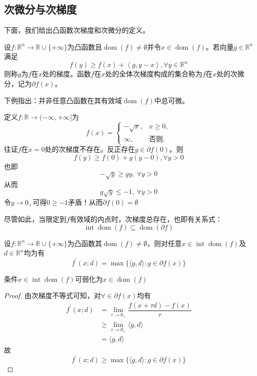 \subsection{次微分与次梯度}
下面，我们给出凸函数次梯度和次微分的定义。
\begin{definition}
    设$f:\mathbb{R}^n\to\mathbb{R}\cup\{+\infty\}$为凸函数且$\operatorname{dom}(f)\neq \emptyset$并令$x\in\operatorname{dom}(f)$。若向量$g\in \mathbb{R}^n$满足
    \[
        f(y)\geq f(x) + \left\langle g, y-x \right\rangle,\forall y\in\mathbb{R}^n
    \]
    则称$g$为$f$在$x$处的梯度。函数$f$在$x$处的全体次梯度构成的集合称为$f$在$x$处的次微分，记为$\partial f(x)$。
\end{definition}
下例指出：并非任意凸函数在其有效域$\operatorname{dom}(f)$中总可微。
\begin{example}
    定义$f:\mathbb{R}\to (-\infty,+\infty]$为
    \[
        \left.f(x)=\left\{
            \begin{array}{cc}
                -\sqrt{x},&x\geq0,\\
                \infty,&\text{否则}.
            \end{array}
        \right.\right.
    \]
    往证$f$在$x = 0$处的次梯度不存在。反正存在$g\in \partial f(0)$。则
    \[
        f(y)\geq f(0)+g(y-0),\forall y>0
    \]
    也即
    \[
        -\sqrt{y}\geq gy,\ \forall y>0
    \]
    从而
    \[
        g\sqrt{y}\leq -1,\ \forall y>0
    \]
    令$y\to 0_+$可得$0\geq -1$矛盾！从而$\partial f(0) = \emptyset$
\end{example}
尽管如此，当限定到$f$有效域的内点时，次梯度总存在，也即有关系式：
\begin{equation}\label{eq:intPoint}
    \operatorname{int}\operatorname{dom}(f)\subseteq \operatorname{dom}(\partial f)
\end{equation}
\begin{theorem}
    设$f:\mathbb{R}^n\to \mathbb{R}\cup \{+\infty\}$为凸函数其$\operatorname{dom}(f)\neq \emptyset$，则对任意$x\in \operatorname{int}\operatorname{dom}(f)$及$d\in\mathbb{R}^n$均为有
    \[
        f^{\prime}(x;d)=\max \{ \langle g,d \rangle:g\in \partial f(x) \}
    \]
    \begin{remark}
        条件$x\in \operatorname{int}\operatorname{dom}(f)$可弱化为$x\in\operatorname{dom}(f)$
    \end{remark}
\end{theorem}
\begin{proof}
    由次梯度不等式可知，对$\forall \in\partial f(x)$均有
    \[
        \begin{array}{ll}
            f^{\prime}(x;d) &= \lim\limits_{\tau\to 0_+}\dfrac{f(x+\tau d)-f(x)}{\tau}\\
            &\geq \lim\limits_{\tau\to 0_+}\langle g,d \rangle\\
            &=\langle g,d\rangle
        \end{array}
    \]
    故
    \[
        f^{\prime}(x;d)\geq \max\{ \langle g,d\rangle:g\in \partial f(x) \}
    \]
\end{proof}
